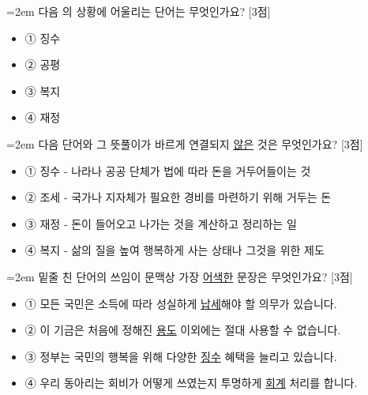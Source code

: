 \documentclass[12pt,a4paper]{article}
\newcommand{\qnum}[1]{%
  \tikz[baseline=(num.base)]{%
    \node[circle, fill=numCircle, text=white, inner sep=0pt,
          minimum size=18pt, font=\small\bfseries] (num) {#1};%
  }%
}
\newcommand{\pts}[1]{%
  \hfill\textcolor{ptsBadge}{[#1점]}%
}
\begin{document}
\vspace{4mm}
\begin{minipage}{\columnwidth}
{\hangindent=2em
\qnum{3}\enspace 다음 의 상황에 어울리는 단어는 무엇인가요? \pts{3}
\par}

\vspace{3mm}
\begin{itemize}[leftmargin=2.5em, labelsep=0.3em, label={}, itemsep=4pt, parsep=1pt, topsep=0pt]
  \item ① 징수
  \item ② 공평
  \item ③ 복지
  \item ④ 재정
\end{itemize}
\end{minipage}
\vspace{4mm}

\vspace{4mm}
\begin{minipage}{\columnwidth}
{\hangindent=2em
\qnum{4}\enspace 다음 단어와 그 뜻풀이가 바르게 연결되지 \uline{않은} 것은 무엇인가요? \pts{3}
\par}

\vspace{3mm}
\begin{itemize}[leftmargin=2.5em, labelsep=0.3em, label={}, itemsep=4pt, parsep=1pt, topsep=0pt]
  \item ① 징수 - 나라나 공공 단체가 법에 따라 돈을 거두어들이는 것
  \item ② 조세 - 국가나 지자체가 필요한 경비를 마련하기 위해 거두는 돈
  \item ③ 재정 - 돈이 들어오고 나가는 것을 계산하고 정리하는 일
  \item ④ 복지 - 삶의 질을 높여 행복하게 사는 상태나 그것을 위한 제도
\end{itemize}
\end{minipage}
\vspace{4mm}

\vspace{4mm}
\begin{minipage}{\columnwidth}
{\hangindent=2em
\qnum{5}\enspace 밑줄 친 단어의 쓰임이 문맥상 가장 \uline{어색한} 문장은 무엇인가요? \pts{3}
\par}

\vspace{3mm}
\begin{itemize}[leftmargin=2.5em, labelsep=0.3em, label={}, itemsep=4pt, parsep=1pt, topsep=0pt]
  \item ① 모든 국민은 소득에 따라 성실하게 \uline{납세}해야 할 의무가 있습니다.
  \item ② 이 기금은 처음에 정해진 \uline{용도} 이외에는 절대 사용할 수 없습니다.
  \item ③ 정부는 국민의 행복을 위해 다양한 \uline{징수} 혜택을 늘리고 있습니다.
  \item ④ 우리 동아리는 회비가 어떻게 쓰였는지 투명하게 \uline{회계} 처리를 합니다.
\end{itemize}
\end{minipage}
\vspace{4mm}
\end{document}
